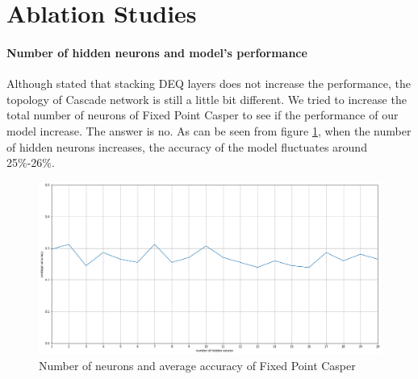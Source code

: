 \documentclass[runningheads]{llncs}
\begin{document}
\section{Ablation Studies}

\paragraph{\textbf{Number of hidden neurons and model's performance}} Although \cite{deq_paper} stated that stacking DEQ layers does not increase the performance, the topology of Cascade network is still a little bit different. We tried to increase the total number of neurons of Fixed Point Casper to see if the performance of our model increase. The answer is no. As can be seen from figure \ref{fig:fpcp}, when the number of hidden neurons increases, the accuracy of the model fluctuates around 25\%-26\%.
\begin{figure}
    \centering
    \includegraphics[width=\textwidth]{hidden_neuron.PNG}
    \caption{Number of neurons and average accuracy of Fixed Point Casper}
    \label{fig:fpcp}
\end{figure}
\end{document}
